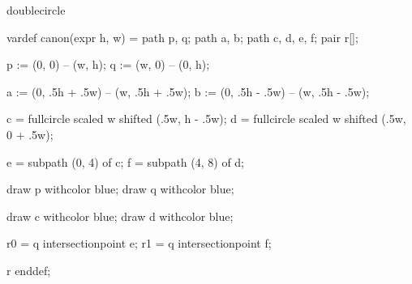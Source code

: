 

\startenvironment doublecircle

	\startMPdefinitions
		vardef canon(expr h, w) =
			path p, q;
			path a, b;
			path c, d, e, f;
			pair r[];


			p := (0, 0) -- (w, h);
			q := (w, 0) -- (0, h);

			a := (0, .5h + .5w) -- (w, .5h + .5w); %
			b := (0, .5h - .5w) -- (w, .5h - .5w); %

			c = fullcircle scaled w shifted (.5w, h - .5w); %
			d = fullcircle scaled w shifted (.5w, 0 + .5w); %

			e = subpath (0, 4) of c; %
			f = subpath (4, 8) of d; %

			draw p withcolor blue;
			draw q withcolor blue;

			draw c withcolor blue;
			draw d withcolor blue;

			r0 = q intersectionpoint e; %
			r1 = q intersectionpoint f; %

			r
		enddef;
	\stopMPdefinitions

\stopenvironment

